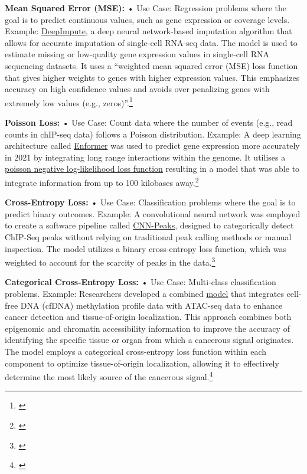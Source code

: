 \documentclass[
]{book}
\begin{document}
\textbf{Mean Squared Error (MSE):}
• Use Case: Regression problems where the goal is to predict continuous values, such as gene expression or coverage levels.
Example: \href{https://genomebiology.biomedcentral.com/articles/10.1186/s13059-019-1837-6}{DeepImpute}, a deep neural network-based imputation algorithm that allows for accurate imputation of single-cell RNA-seq data. The model is used to estimate missing or low-quality gene expression values in single-cell RNA sequencing datasets. It uses a ``weighted mean squared error (MSE) loss function that gives higher weights to genes with higher expression values. This emphasizes accuracy on high confidence values and avoids over penalizing genes with extremely low values (e.g., zeros)''.\footnote{\citet{cedric2019}}

\textbf{Poisson Loss:}
• Use Case: Count data where the number of events (e.g., read counts in chIP-seq data) follows a Poisson distribution.
Example: A deep learning architecture called \href{https://www.nature.com/articles/s41592-021-01252-x}{Enformer} was used to predict gene expression more accurately in 2021 by integrating long range interactions within the genome. It utilises a \href{https://pytorch.org/docs/stable/generated/torch.nn.PoissonNLLLoss.html}{poisson negative log-likelihood loss function} resulting in a model that was able to integrate information from up to 100 kilobases away.\footnote{\citet{avsec2021}}

\textbf{Cross-Entropy Loss:}
• Use Case: Classification problems where the goal is to predict binary outcomes.
Example: A convolutional neural network was employed to create a software pipeline called \href{https://www.nature.com/articles/s41598-020-64655-4}{CNN-Peaks}, designed to categorically detect ChIP-Seq peaks without relying on traditional peak calling methods or manual inspection. The model utilizes a binary cross-entropy loss function, which was weighted to account for the scarcity of peaks in the data.\footnote{\citet{oh2020}}

\textbf{Categorical Cross-Entropy Loss:}
• Use Case: Multi-class classification problems.
Example: Researchers developed a combined \href{https://www.ncbi.nlm.nih.gov/pmc/articles/PMC10085982/}{model} that integrates cell-free DNA (cfDNA) methylation profile data with ATAC-seq data to enhance cancer detection and tissue-of-origin localization. This approach combines both epigenomic and chromatin accessibility information to improve the accuracy of identifying the specific tissue or organ from which a cancerous signal originates. The model employs a categorical cross-entropy loss function within each component to optimize tissue-of-origin localization, allowing it to effectively determine the most likely source of the cancerous signal.\footnote{\citet{bae2017}}
\end{document}
